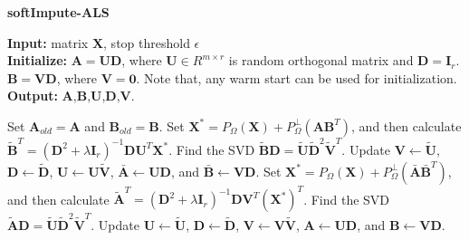 \documentclass[11pt]{article}
\begin{document}
	\begin{algorithm}[h]
	\caption{\small \textbf{softImpute-ALS}}
	\label{alg_1}
	\textbf{Input:} matrix $\boldsymbol{X}$, stop threshold $\epsilon$\\
	\textbf{Initialize:} $\boldsymbol{A}=\boldsymbol{U}\boldsymbol{D}$, where $\boldsymbol{U}\in R^{m \times r }$ is random orthogonal matrix and $\boldsymbol{D} = \boldsymbol{I}_r$. $\boldsymbol{B}=\boldsymbol{V}\boldsymbol{D}$, where $\boldsymbol{V}=\boldsymbol{0}$. Note that, any warm start can be used for initialization. \\
	\textbf{Output:} $\boldsymbol{A}$,$\boldsymbol{B}$,$\boldsymbol{U}$,$\boldsymbol{D}$,$\boldsymbol{V}$.
	\begin{algorithmic}
		\Repeat
		\State Set $\boldsymbol{A}_{old}=\boldsymbol{A}$ and $\boldsymbol{B}_{old}=\boldsymbol{B}$.
		\State Set $\boldsymbol{X}^*=P_{\Omega}(\boldsymbol{X})+P_{\Omega}^{\perp}(\boldsymbol{A}\boldsymbol{B}^T)$, and then calculate $\tilde{\boldsymbol{B}}^T=(\boldsymbol{D}^2+\lambda\boldsymbol{I}_r)^{-1}\boldsymbol{D}\boldsymbol{U}^T\boldsymbol{X}^*$. Find the SVD $\tilde{\boldsymbol{B}}\boldsymbol{D} = \tilde{\boldsymbol{U}}\tilde{\boldsymbol{D}}^2\tilde{\boldsymbol{V}}^T$. 
		\State Update $\boldsymbol{V} \leftarrow \tilde{\boldsymbol{U}}$, $\boldsymbol{D} \leftarrow \tilde{\boldsymbol{D}}$, $\boldsymbol{U} \leftarrow \boldsymbol{U}\tilde{\boldsymbol{V}}$, $\bar{\boldsymbol{A}} \leftarrow \boldsymbol{U}\boldsymbol{D}$, and $\bar{\boldsymbol{B}} \leftarrow \boldsymbol{V}\boldsymbol{D}$.
		\State Set $\boldsymbol{X}^*=P_{\Omega}(\boldsymbol{X})+P_{\Omega}^{\perp}(\bar{\boldsymbol{A}}\bar{\boldsymbol{B}}^T)$, and then calculate $\tilde{\boldsymbol{A}}^T=(\boldsymbol{D}^2+\lambda\boldsymbol{I}_r)^{-1}\boldsymbol{D}\boldsymbol{V}^T(\boldsymbol{X}^*)^T$. Find the SVD $\tilde{\boldsymbol{A}}\boldsymbol{D} = \tilde{\boldsymbol{U}}\tilde{\boldsymbol{D}}^2\tilde{\boldsymbol{V}}^T$. 
		\State Update $\boldsymbol{U} \leftarrow \tilde{\boldsymbol{U}}$, $\boldsymbol{D} \leftarrow \tilde{\boldsymbol{D}}$, $\boldsymbol{V} \leftarrow \boldsymbol{V}\tilde{\boldsymbol{V}}$, $\boldsymbol{A} \leftarrow \boldsymbol{U}\boldsymbol{D}$, and $\boldsymbol{B} \leftarrow \boldsymbol{V}\boldsymbol{D}$.
		
	\end{algorithmic}
\end{algorithm}
\end{document}
